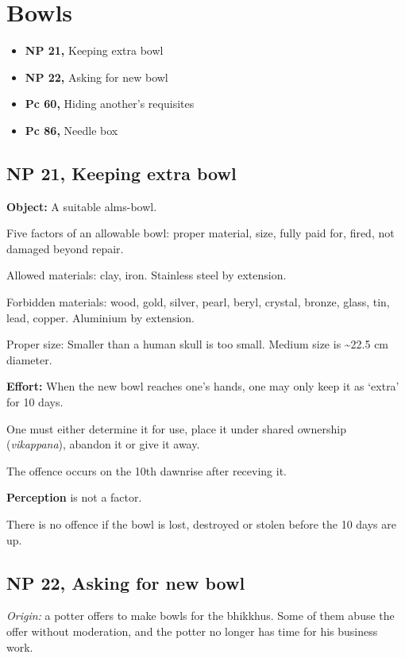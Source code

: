 \chapter{Bowls}

\begin{itemize}
\tightlist
\item
  \textbf{NP 21,} Keeping extra bowl
\item
  \textbf{NP 22,} Asking for new bowl
\item
  \textbf{Pc 60,} Hiding another's requisites
\item
  \textbf{Pc 86,} Needle box
\end{itemize}

\section{NP 21, Keeping extra bowl}

\textbf{Object:} A suitable alms-bowl.

Five factors of an allowable bowl: proper material, size, fully paid
for, fired, not damaged beyond repair.

Allowed materials: clay, iron. Stainless steel by extension.

Forbidden materials: wood, gold, silver, pearl, beryl, crystal, bronze,
glass, tin, lead, copper. Aluminium by extension.

Proper size: Smaller than a human skull is too small. Medium size is
\textasciitilde22.5 cm diameter.

\textbf{Effort:} When the new bowl reaches one's hands, one may only
keep it as `extra' for 10 days.

One must either determine it for use, place it under shared ownership
(\emph{vikappana}), abandon it or give it away.

The offence occurs on the 10th dawnrise after receving it.

\textbf{Perception} is not a factor.

There is no offence if the bowl is lost, destroyed or stolen before the
10 days are up.

\section{NP 22, Asking for new bowl}

\emph{Origin:} a potter offers to make bowls for the bhikkhus. Some of
them abuse the offer without moderation, and the potter no longer has
time for his business work.

